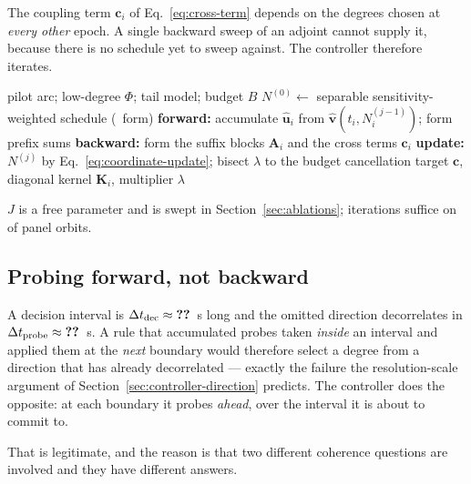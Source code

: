 The coupling term $\mathbf c_i$ of Eq.~\eqref{eq:cross-term} depends on the
degrees chosen at \emph{every other} epoch. A single backward sweep of an
adjoint cannot supply it, because there is no schedule yet to sweep against.
The controller therefore iterates.

\begin{algorithm}[!htbp]
\caption{Forward--backward degree allocation on a pilot arc}
\label{alg:ifbda}
\begin{algorithmic}[1]
\Require pilot arc; low-degree $\Phi$; tail model; budget $B$
\State $N^{(0)} \gets$ separable sensitivity-weighted schedule (\Asens\ form)
  \State \textbf{forward:} accumulate $\hat{\mathbf u}_i$ from
    $\hat{\mathbf v}(t_i,N^{(j-1)}_i)$; form prefix sums
  \State \textbf{backward:} form the suffix blocks $\mathbf A_i$ and the cross
    terms $\mathbf c_i$
  \State \textbf{update:} $N^{(j)}$ by Eq.~\eqref{eq:coordinate-update};
    bisect $\lambda$ to the budget
\EndFor
\State \Return cancellation target $\mathbf c$, diagonal kernel $\mathbf K_i$,
  multiplier $\lambda$
\end{algorithmic}
\end{algorithm}

$J$ is a free parameter and is swept in Section~\ref{sec:ablations};
 iterations suffice on  of  panel orbits.

\subsection{Probing forward, not backward}
\label{sec:controller-causality}

A decision interval is $\Delta t_{\mathrm{dec}}\approx\ph{value}$~s long and the
omitted direction decorrelates in $\Delta t_{\mathrm{probe}}\approx\ph{value}$~s.
A rule that accumulated probes taken \emph{inside} an interval and applied them
at the \emph{next} boundary would therefore select a degree from a direction
that has already decorrelated --- exactly the failure the resolution-scale
argument of Section~\ref{sec:controller-direction} predicts. The controller
does the opposite: at each boundary it probes \emph{ahead}, over the interval it
is about to commit to.

That is legitimate, and the reason is that two different coherence questions are
involved and they have different answers.

